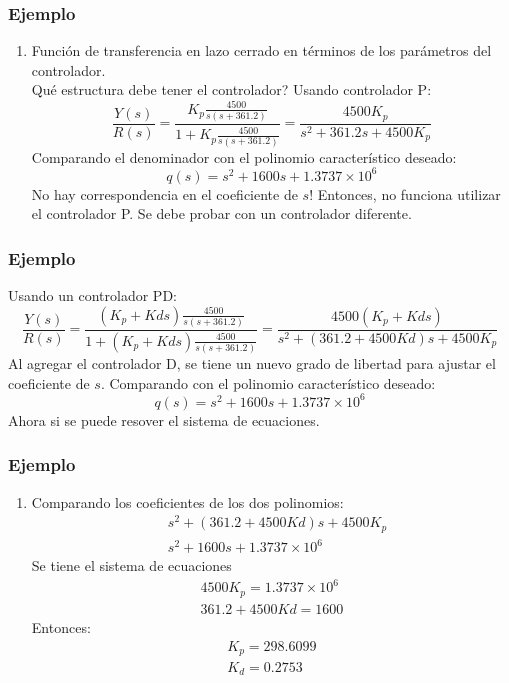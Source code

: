 \documentclass[aspectratio=169,handout]{beamer}
\theoremstyle{definition}
\theoremstyle{plain}
\theoremstyle{remark}
\newcounter{saveenumi}
\newcommand{\seti}{\setcounter{saveenumi}{\value{enumi}}}
\newcommand{\conti}{\setcounter{enumi}{\value{saveenumi}}}
\begin{document}
\begin{frame}[<+->]\frametitle{Ejemplo}
\begin{enumerate}
	\conti
	\item Función de transferencia en lazo cerrado en términos de los parámetros del controlador.\\
	Qué estructura debe tener el controlador? Usando controlador P:
	\begin{equation*}
		\frac{Y(s)}{R(s)} = \frac{K_p\frac{4500}{s(s+361.2)}}{1 + K_p\frac{4500}{s(s+361.2)}} = \frac{4500 K_p}{s^2 + 361.2s + 4500K_p}
	\end{equation*}
	Comparando el denominador con el polinomio característico deseado: 
	\begin{equation*}
		q(s) = s^2 + 1600s +1.3737\times 10^6
	\end{equation*}
	No hay correspondencia en el coeficiente de $s$! Entonces, no funciona utilizar el controlador P. Se debe probar con un controlador diferente.
	\seti
\end{enumerate}	
\end{frame}

\begin{frame}[<+->]\frametitle{Ejemplo}
	Usando un controlador PD:
	\begin{equation*}
		\frac{Y(s)}{R(s)} = \frac{(K_p + Kds)\frac{4500}{s(s+361.2)}}{1 + (K_p + Kds)\frac{4500}{s(s+361.2)}} = \frac{4500 (K_p + Kds)}{s^2 + (361.2+4500Kd)s + 4500K_p}
	\end{equation*}
	Al agregar el controlador D, se tiene un nuevo grado de libertad para ajustar el coeficiente de $s$. Comparando con el polinomio característico deseado:
	\begin{equation*}
		q(s) = s^2 + 1600s + 1.3737\times 10^6
	\end{equation*}
	Ahora si se puede resover el sistema de ecuaciones.
\end{frame}

\begin{frame}[<+->]\frametitle{Ejemplo}
\begin{enumerate}
	\conti
	\item Comparando los coeficientes de los dos polinomios:
	\begin{align*}
		&s^2 + (361.2+4500Kd)s + 4500K_p\\
		&s^2 + 1600s +1.3737\times 10^6
	\end{align*}
	Se tiene el sistema de ecuaciones
	\begin{align*}
		4500K_p = 1.3737\times 10^6\\
		361.2+4500Kd = 1600
	\end{align*}
	Entonces:
	\begin{align*}
		K_p = 298.6099\\
		K_d = 0.2753
	\end{align*}
	\seti
\end{enumerate}
\end{frame}
\end{document}
